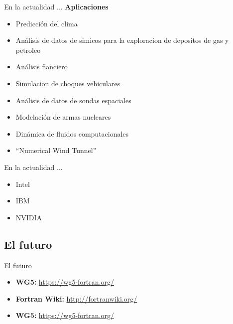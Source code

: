 \begin{frame}[fragile]{En la actualidad ...}
  \textbf{Aplicaciones}
  \begin{itemize}[<+(1)->]
    \item Predicción del clima
    \item Análisis de datos de simicos para la exploracion de depositos de gas y petroleo
    \item Análisis fianciero
    \item Simulacion de choques vehiculares
    \item Análisis de datos de sondas espaciales
    \item Modelación de armas nucleares
    \item Dinámica de fluidos computacionales
    \item ``Numerical Wind Tunnel''
  \end{itemize}
\end{frame}


\begin{frame}[fragile]{En la actualidad ...}
  \begin{itemize}[<+(1)->]
    \item Intel
    \item IBM
    \item NVIDIA
  \end{itemize}
\end{frame}


\subsection{El futuro}
\begin{frame}[fragile]{El futuro}
  \begin{itemize}[<+(1)->]
    \item \textbf{WG5: }\url{https://wg5-fortran.org/}
    \item \textbf{Fortran Wiki: }\url{http://fortranwiki.org/}
    \item \textbf{WG5: }\url{https://wg5-fortran.org/}
  \end{itemize}
\end{frame}
